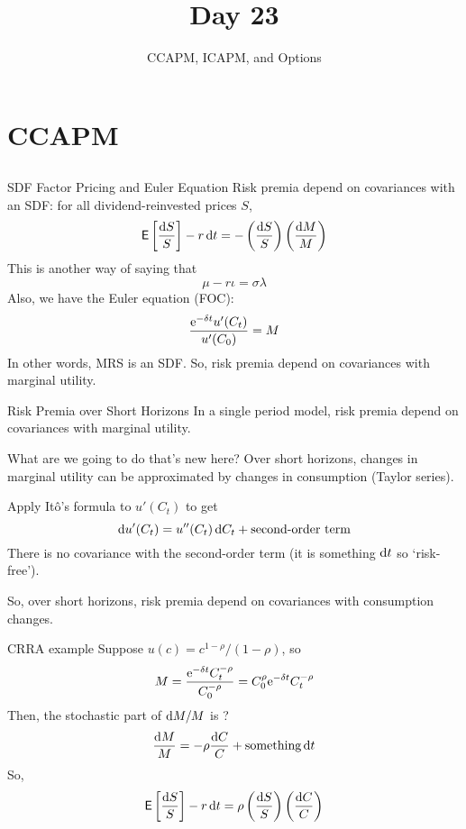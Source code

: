 \documentclass[xcolor=dvipsnames,10pt]{beamer}
\begin{document}
\title{\vskip 0.5in Day 23}
\subtitle{CCAPM, ICAPM, and Options}

\begin{frame}
  \titlepage
\end{frame}

\section{CCAPM}\subsection{}

\begin{frame}{SDF Factor Pricing and Euler Equation}
Risk premia depend on covariances with an SDF: for all dividend-reinvested prices $S$,
$$\mathsf{E}\left[\frac{\mathrm{d} S}{S}\right] -r\,\mathrm{d} t= - \left(\frac{\mathrm{d} S}{S}\right)\left(\frac{\mathrm{d} M}{M}\right)$$
This is another way of saying that
$$\mu - r\iota = \sigma\lambda$$
Also, we have the Euler equation (FOC):
$$\frac{\mathrm{e}^{-\delta t}u'(C_t)}{u'(C_0)} = M$$
In other words, MRS is an SDF.  So, risk premia depend on covariances with marginal utility.
\end{frame}

\begin{frame}{Risk Premia over Short Horizons}
    In a single period model, risk premia depend on covariances with marginal utility.
    
    What are we going to do that's new here?  Over short horizons, changes in marginal utility can be approximated by changes in consumption (Taylor series).
    
    Apply It\^o's formula to $u'(C_t)$ to get
    $$\mathrm{d} u'(C_t) = u''(C_t)\,\mathrm{d} C_t + \text{second-order term}$$
    There is no covariance with the second-order term (it is something $\mathrm{d} t$ so `risk-free').  
    
    So, over short horizons, risk premia depend on covariances with consumption changes.
\end{frame}
\begin{frame}{CRRA example}
  Suppose $u(c) = c^{1-\rho}/(1-\rho)$, so
  $$M=\frac{\mathrm{e}^{-\delta t}C_t^{-\rho}}{C_0^{-\rho}} =C_0^\rho\mathrm{e}^{-\delta t}C_t^{-\rho}$$
  Then, the stochastic part of $\mathrm{d} M/M$ is ?
  \pause 
  $$\frac{\mathrm{d} M}{M} = -\rho \frac{\mathrm{d} C}{C} + \text{something}\,\mathrm{d} t$$
  \pause
  So,
  $$\mathsf{E}\left[\frac{\mathrm{d} S}{S}\right] -r\,\mathrm{d} t= \rho \left(\frac{\mathrm{d} S}{S}\right)\left(\frac{\mathrm{d} C}{C}\right)$$
\end{frame}
\end{document}
